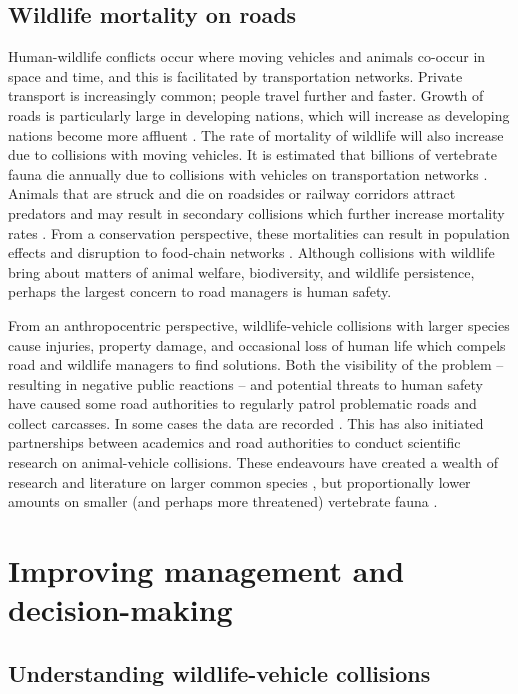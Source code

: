 \subsection{Wildlife mortality on roads}

Human-wildlife conflicts occur where moving vehicles and animals co-occur in space and time, and this is facilitated by transportation networks. Private transport is increasingly common; people travel further and faster. Growth of roads is particularly large in developing nations, which will increase as developing nations become more affluent \citep{rvdr15}. The rate of mortality of wildlife will also increase due to collisions with moving vehicles. It is estimated that billions of vertebrate fauna die annually due to collisions with vehicles on transportation networks \citep{seil06}. Animals that are struck and die on roadsides or railway corridors attract predators and may result in secondary collisions which further increase mortality rates \citep{spel98}. From a conservation perspective, these mortalities can result in population effects and disruption to food-chain networks \citep{ramp06b,cham10,pola14}.  Although collisions with wildlife bring about matters of animal welfare, biodiversity, and wildlife persistence, perhaps the largest concern to road managers is human safety. 

From an anthropocentric perspective, wildlife-vehicle collisions with larger species cause injuries, property damage, and occasional loss of human life which compels road and wildlife managers to find solutions. Both the visibility of the problem -- resulting in negative public reactions -- and potential threats to human safety have caused some road authorities to regularly patrol problematic roads and collect carcasses. In some cases the data are recorded \citep{huij07a}. This has also initiated partnerships between academics and road authorities to conduct scientific research on animal-vehicle collisions.  These endeavours have created a wealth of research and literature on larger common species \citep[e.g.][]{biss08b,clev02,romi96,sudh09}, but proportionally lower amounts on smaller (and perhaps more threatened) vertebrate fauna \citep[e.g.][]{clev03}.

\section{Improving management and decision-making}

\subsection{Understanding wildlife-vehicle collisions}


